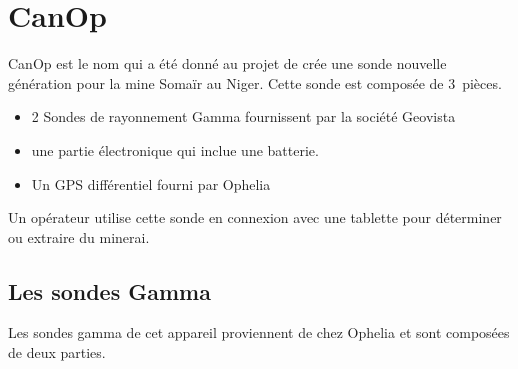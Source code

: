 \section{CanOp}
\label{sec_CanOp}
CanOp est le nom qui a été donné au projet de crée une sonde nouvelle génération pour la mine Somaïr au Niger. Cette sonde est composée de 3~pièces. 
\begin{itemize}
    \item 2 Sondes de rayonnement Gamma fournissent par la société Geovista
    \item une partie électronique qui inclue une batterie.
    \item Un GPS différentiel fourni par Ophelia 
\end{itemize}
Un opérateur utilise cette sonde en connexion avec une tablette pour déterminer ou extraire du minerai. 
\subsection{Les sondes Gamma}
\label{ssec_sonde}
Les sondes gamma de cet appareil proviennent de chez Ophelia et sont composées de deux parties.
